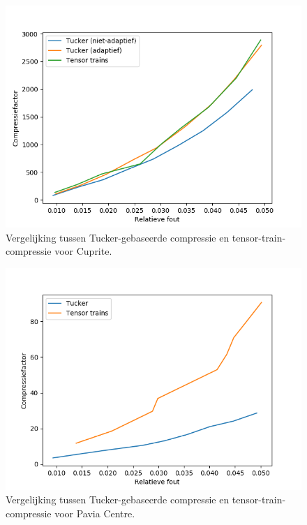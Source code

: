 \begin{figure}[]
  \centering
  \includegraphics[scale=0.7]{images/tucker_vs_tensor_trains_Cuprite.png}
  \caption{Vergelijking tussen Tucker-gebaseerde compressie en tensor-train-compressie voor Cuprite.}
\label{fig:tucker-vs-tensor-trains-cuprite}
\end{figure}

\begin{figure}[]
  \centering
  \includegraphics[scale=0.7]{images/tucker_vs_tensor_trains_Pavia_Centre.png}
  \caption{Vergelijking tussen Tucker-gebaseerde compressie en tensor-train-compressie voor Pavia Centre.}
\label{fig:tucker-vs-tensor-trains-pavia-centre}
\end{figure}

